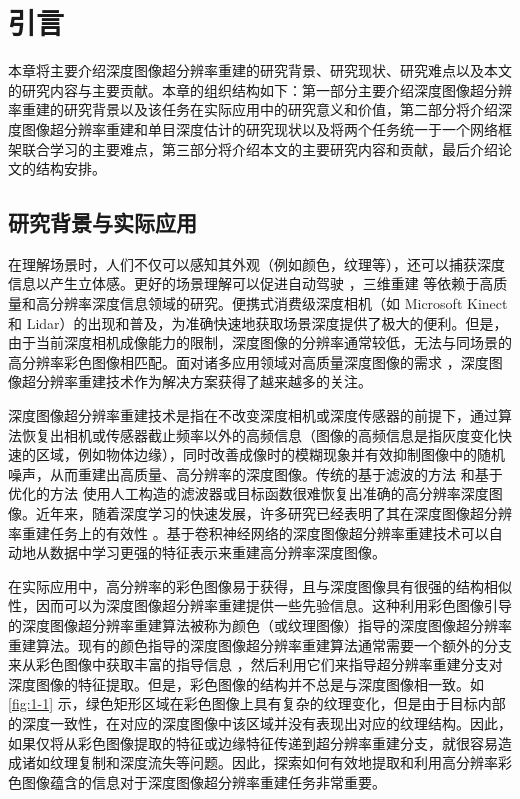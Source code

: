 \chapter{引言}

\setlength{\baselineskip}{20pt}

本章将主要介绍深度图像超分辨率重建的研究背景、研究现状、研究难点以及本文的研究内容与主要贡献。本章的组织结构如下：第一部分主要介绍深度图像超分辨率重建的研究背景以及该任务在实际应用中的研究意义和价值，第二部分将介绍深度图像超分辨率重建和单目深度估计的研究现状以及将两个任务统一于一个网络框架联合学习的主要难点，第三部分将介绍本文的主要研究内容和贡献，最后介绍论文的结构安排。

\section{研究背景与实际应用}

在理解场景时，人们不仅可以感知其外观（例如颜色，纹理等），还可以捕获深度信息以产生立体感。更好的场景理解可以促进自动驾驶 \cite{DBLP:conf/iros/KerlSC13}，三维重建 \cite{DBLP:journals/pami/ImHCJJK19} 等依赖于高质量和高分辨率深度信息领域的研究。便携式消费级深度相机（如 Microsoft Kinect 和 Lidar）的出现和普及，为准确快速地获取场景深度提供了极大的便利。但是，由于当前深度相机成像能力的限制，深度图像的分辨率通常较低，无法与同场景的高分辨率彩色图像相匹配。面对诸多应用领域对高质量深度图像的需求 \cite{DBLP:journals/corr/abs-1907-06781, DBLP:journals/pami/GeLYT19, SilbermanHKF12}，深度图像超分辨率重建技术作为解决方案获得了越来越多的关注。

深度图像超分辨率重建技术是指在不改变深度相机或深度传感器的前提下，通过算法恢复出相机或传感器截止频率以外的高频信息（图像的高频信息是指灰度变化快速的区域，例如物体边缘），同时改善成像时的模糊现象并有效抑制图像中的随机噪声，从而重建出高质量、高分辨率的深度图像。传统的基于滤波的方法 \cite{0001TT13,LuSMLD12} 和基于优化的方法 \cite{DBLP:conf/iccv/FerstlRRRB13, ParkKTBK11} 使用人工构造的滤波器或目标函数很难恢复出准确的高分辨率深度图像。近年来，随着深度学习的快速发展，许多研究已经表明了其在深度图像超分辨率重建任务上的有效性 \cite{HuiLT16, WenSLLF19}。基于卷积神经网络的深度图像超分辨率重建技术可以自动地从数据中学习更强的特征表示来重建高分辨率深度图像。

在实际应用中，高分辨率的彩色图像易于获得，且与深度图像具有很强的结构相似性，因而可以为深度图像超分辨率重建提供一些先验信息。这种利用彩色图像引导的深度图像超分辨率重建算法被称为颜色（或纹理图像）指导的深度图像超分辨率重建算法。现有的颜色指导的深度图像超分辨率重建算法通常需要一个额外的分支来从彩色图像中获取丰富的指导信息 \cite{LutioDWS19}，然后利用它们来指导超分辨率重建分支对深度图像的特征提取。但是，彩色图像的结构并不总是与深度图像相一致。如 \ref{fig:1-1} 示，绿色矩形区域在彩色图像上具有复杂的纹理变化，但是由于目标内部的深度一致性，在对应的深度图像中该区域并没有表现出对应的纹理结构。因此，如果仅将从彩色图像提取的特征或边缘特征传递到超分辨率重建分支，就很容易造成诸如纹理复制和深度流失等问题。因此，探索如何有效地提取和利用高分辨率彩色图像蕴含的信息对于深度图像超分辨率重建任务非常重要。

